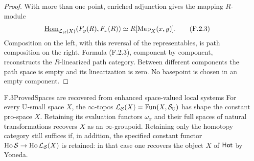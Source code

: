 \begin{proof}
With more than one point, enriched adjunction gives the mapping
$R$-module
\[
 \underline{\operatorname{Hom}}_{\mathcal L_R(X)}(F_y(R),F_x(R))
                 \simeq R[\operatorname{Map}_X(x,y)].                       \tag{F.2.3}
\]
Composition on the left, with this reversal of the representables,
is path composition on the right.  Formula (F.2.3), component by
component, reconstructs the $R$-linearized path category.  Between
different components the path space is empty and its linearization
is zero.  No basepoint is chosen in an empty component.
\end{proof}

\begin{claim}{F.3}{Proved}{Spaces are recovered from enhanced space-valued local systems}
For every $\mathbb U$-small space $X$, the $\infty$-topos
$\mathcal L_{\mathcal S}(X)=\operatorname{Fun}(X,\mathcal S_\mathbb U)$ has shape
the constant pro-space $X$.  Retaining its evaluation functors
$\omega_x$ and their full spaces of natural transformations
recovers $X$ as an $\infty$-groupoid.  Retaining only the
homotopy category still suffices if, in addition, the specified
constant functor
$\operatorname{Ho}\mathcal S\to\operatorname{Ho}\mathcal L_{\mathcal S}(X)$ is retained:
in that case one recovers the object $X$ of $\mathsf{Hot}$ by Yoneda.
\end{claim}
